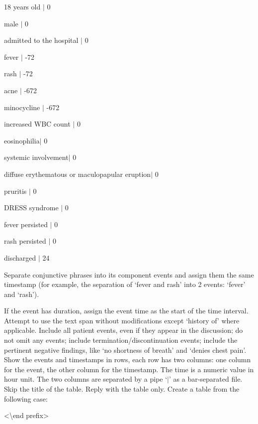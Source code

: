 \begin{tcolorbox}[breakable,
  colback=teal!5,
  colframe=teal!70!black,
  title=Textual Time Series Generation Prompt,
  boxrule=2pt,
]
18 years old $|$ 0\

male $|$ 0\

admitted to the hospital $|$ 0\

fever $|$ -72\

rash $|$ -72\

acne $|$  -672\

minocycline $|$  -672\

increased WBC count $|$ 0\

eosinophilia$|$ 0\

systemic involvement$|$ 0\

diffuse erythematous or maculopapular eruption$|$ 0\

pruritis $|$ 0\

DRESS syndrome $|$ 0\

fever persisted $|$ 0\

rash persisted $|$ 0\

discharged $|$ 24\ 

\color{ChSixDarkRed}
Separate conjunctive phrases into its component events and assign them the same timestamp (for example, the separation of `fever and rash' into 2 events: `fever' and `rash'). 

\color{black} If the event has duration, assign the event time as the start of the time interval. Attempt to use the text span without modifications except `history of' where applicable. Include all patient events, even if they appear in the discussion; do not omit any events; include termination/discontinuation events; include the pertinent negative findings, like `no shortness of breath' and `denies chest pain'.  Show the events and timestamps in rows, each row has two columns: one column for the event, the other column for the timestamp.  The time is a numeric value in hour unit. The two columns are separated by a pipe `$|$' as a bar-separated file. Skip the title of the table. Reply with the table only. Create a table from the following case: 

\textless \textbackslash end prefix\textgreater

\end{tcolorbox}
